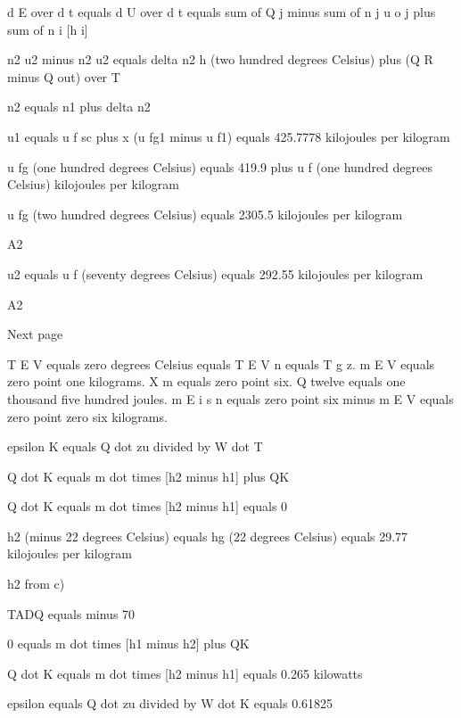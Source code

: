 d E over d t equals d U over d t equals sum of Q j minus sum of n j u o j plus sum of n i [h i]  

n2 u2 minus n2 u2 equals delta n2 h (two hundred degrees Celsius) plus (Q R minus Q out) over T  

n2 equals n1 plus delta n2  

u1 equals u f sc plus x (u fg1 minus u f1) equals 425.7778 kilojoules per kilogram  

u fg (one hundred degrees Celsius) equals 419.9 plus u f (one hundred degrees Celsius) kilojoules per kilogram  

u fg (two hundred degrees Celsius) equals 2305.5 kilojoules per kilogram  

A2  

u2 equals u f (seventy degrees Celsius) equals 292.55 kilojoules per kilogram  

A2  

Next page

T E V equals zero degrees Celsius equals T E V n equals T g z.  
m E V equals zero point one kilograms.  
X m equals zero point six.  
Q twelve equals one thousand five hundred joules.  
m E i s n equals zero point six minus m E V equals zero point zero six kilograms.

epsilon K equals Q dot zu divided by W dot T

Q dot K equals m dot times [h2 minus h1] plus QK

Q dot K equals m dot times [h2 minus h1] equals 0

h2 (minus 22 degrees Celsius) equals hg (22 degrees Celsius) equals 29.77 kilojoules per kilogram

h2 from c)

TADQ equals minus 70

0 equals m dot times [h1 minus h2] plus QK

Q dot K equals m dot times [h2 minus h1] equals 0.265 kilowatts

epsilon equals Q dot zu divided by W dot K equals 0.61825